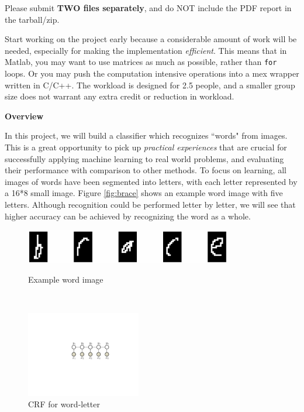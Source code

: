 \documentclass[11pt]{report}
\begin{document}
Please submit {\bf TWO files separately}, and do NOT include the PDF report in the tarball/zip.


Start working on the project early
because a considerable amount of work will be needed,
especially for making the implementation \emph{efficient}.
This means that in Matlab, you may want to use matrices as much as possible,
rather than \verb#for# loops.
Or you may push the computation intensive operations into a mex wrapper written in C/C++.
%
The workload is designed for 2.5 people, and a smaller group size  does not warrant any extra credit or reduction in workload.




{\bf \large Overview}




In this project, we will build a classifier which recognizes ``words" from images.
This is a great opportunity to pick up \emph{practical experiences} that are crucial for successfully applying machine learning to real world problems,
and evaluating their performance with comparison to other methods.
To focus on learning, all images of words have been segmented into letters,
with each letter represented by a 16*8 small image.
Figure \ref{fig:brace} shows an example word image with five letters.
Although recognition could be performed letter by letter,
we will see that higher accuracy can be achieved by recognizing the word as a whole.


\begin{figure}[t!]
	\begin{minipage}[b]{0.62\textwidth}
		\centering
		\vspace{-0.6em}
		\includegraphics[width=9cm]{brace.jpg}
		\vspace{0.6em}
		\caption{Example word image}\label{fig:brace}
	\end{minipage}
	~~~
	\begin{minipage}[b]{0.33\textwidth}
		\centering
		\includegraphics[width=5cm]{crf}
		\caption{CRF for word-letter}\label{fig:CRF_model}
	\end{minipage}
\end{figure}
\end{document}

